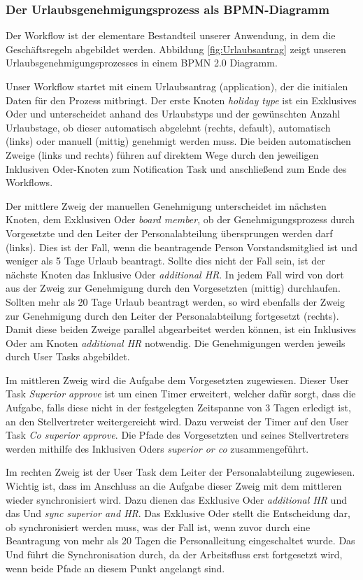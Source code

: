 \subsubsection{Der Urlaubsgenehmigungsprozess als BPMN-Diagramm}
Der Workflow ist der elementare Bestandteil unserer Anwendung, in dem die Geschäftsregeln abgebildet werden. Abbildung \ref{fig:Urlaubsantrag} zeigt unseren Urlaubsgenehmigungsprozesses in einem BPMN 2.0 Diagramm.

Unser Workflow startet mit einem Urlaubsantrag (application), der die initialen Daten für den Prozess mitbringt. Der erste Knoten \textit{holiday type} ist ein Exklusives Oder und unterscheidet anhand des Urlaubstyps und der gewünschten Anzahl Urlaubstage, ob dieser automatisch abgelehnt (rechts, default), automatisch (links) oder manuell (mittig) genehmigt werden muss. Die beiden automatischen Zweige (links und rechts) führen auf direktem Wege durch den jeweiligen Inklusiven Oder-Knoten zum Notification Task und anschließend zum Ende des Workflows.

Der mittlere Zweig der manuellen Genehmigung unterscheidet im nächsten Knoten, dem Exklusiven Oder \textit{board member}, ob der Genehmigungsprozess durch Vorgesetzte und den Leiter der Personalabteilung übersprungen werden darf (links). Dies ist der Fall, wenn die beantragende Person Vorstandsmitglied ist und weniger als 5 Tage Urlaub beantragt. Sollte dies nicht der Fall sein, ist der nächste Knoten das Inklusive Oder \textit{additional HR}. In jedem Fall wird von dort aus der Zweig zur Genehmigung durch den Vorgesetzten (mittig) durchlaufen. Sollten mehr als 20 Tage Urlaub beantragt werden, so wird ebenfalls der Zweig zur Genehmigung durch den Leiter der Personalabteilung fortgesetzt (rechts). Damit diese beiden Zweige parallel abgearbeitet werden können, ist ein Inklusives Oder am Knoten \textit{additional HR} notwendig. Die Genehmigungen werden jeweils durch User Tasks abgebildet.

Im mittleren Zweig wird die Aufgabe dem Vorgesetzten zugewiesen. Dieser User Task \textit{Superior approve} ist um einen Timer erweitert, welcher dafür sorgt, dass die Aufgabe, falls diese nicht in der festgelegten Zeitspanne von 3 Tagen erledigt ist, an den Stellvertreter weitergereicht wird. Dazu verweist der Timer auf den User Task \textit{Co superior approve}. Die Pfade des Vorgesetzten und seines Stellvertreters werden mithilfe des Inklusiven Oders \textit{superior or co} zusammengeführt.

Im rechten Zweig ist der User Task dem Leiter der Personalabteilung zugewiesen. Wichtig ist, dass im Anschluss an die Aufgabe dieser Zweig mit dem mittleren wieder synchronisiert wird. Dazu dienen das Exklusive Oder \textit{additional HR} und das Und \textit{sync superior and HR}. Das Exklusive Oder stellt die Entscheidung dar, ob synchronisiert werden muss, was der Fall ist, wenn zuvor durch eine Beantragung von mehr als 20 Tagen die Personalleitung eingeschaltet wurde. Das Und führt die Synchronisation durch, da der Arbeitsfluss erst fortgesetzt wird, wenn beide Pfade an diesem Punkt angelangt sind.

